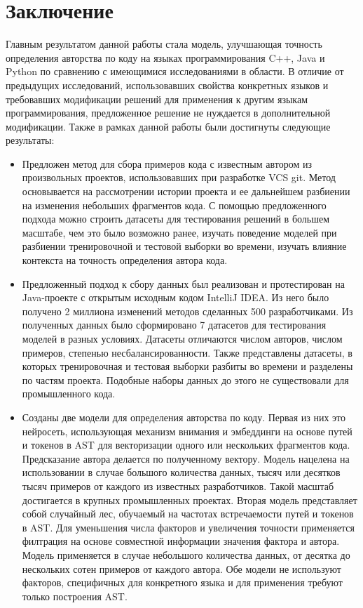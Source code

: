 \section*{Заключение}
Главным результатом данной работы стала модель, улучшающая точность определения авторства по коду на языках программирования C++, Java и Python по сравнению с имеющимися исследованиями в области. В отличие от предыдущих исследований, использовавших свойства конкретных языков и требовавших модификации решений для применения к другим языкам программирования, предложенное решение не нуждается в дополнительной модификации. Также в рамках данной работы были достигнуты следующие результаты:
\begin{itemize}
    \item Предложен метод для сбора примеров кода с известным автором из произвольных проектов, использовавших при разработке VCS git. Метод основывается на рассмотрении истории проекта и ее дальнейшем разбиении на изменения небольших фрагментов кода. С помощью предложенного подхода можно строить датасеты для тестирования решений в большем масштабе, чем это было возможно ранее, изучать поведение моделей при разбиении тренировочной и тестовой выборки во времени, изучать влияние контекста на точность определения автора кода.
    \item Предложенный подход к сбору данных был реализован и протестирован на Java-проекте с открытым исходным кодом IntelliJ IDEA. Из него было получено 2 миллиона изменений методов сделанных 500 разработчиками. Из полученных данных было сформировано 7 датасетов для тестирования моделей в разных условиях. Датасеты отличаются числом авторов, числом примеров, степенью несбалансированности. Также представлены датасеты, в которых тренировочная и тестовая выборки разбиты во времени и разделены по частям проекта. Подобные наборы данных до этого не существовали для промышленного кода.
    \item Созданы две модели для определения авторства по коду. Первая из них это нейросеть, использующая механизм внимания и эмбеддинги на основе путей и токенов в AST для векторизации одного или нескольких фрагментов кода. Предсказание автора делается по полученному вектору. Модель нацелена на использовании в случае большого количества данных, тысяч или десятков тысяч примеров от каждого из известных разработчиков. Такой масштаб достигается в крупных промышленных проектах. Вторая модель представляет собой случайный лес, обучаемый на частотах встречаемости путей и токенов в AST. Для уменьшения числа факторов и увеличения точности применяется филтрация на основе совместной информации значения фактора и автора. Модель применяется в случае небольшого количества данных, от десятка до нескольких сотен примеров от каждого автора. Обе модели не используют факторов, специфичных для конкретного языка и для применения требуют только построения AST.

\end{itemize}
